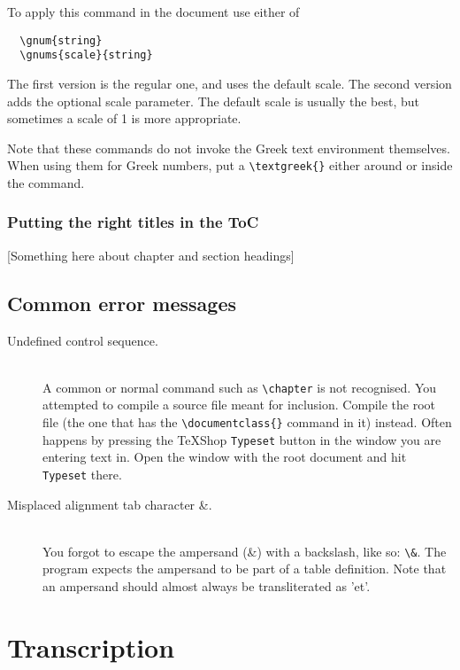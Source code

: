 \documentclass{report}
\begin{document}
To apply this command in the document use either of
\begin{verbatim}
  \gnum{string}
  \gnums{scale}{string}
\end{verbatim}
The first version is the regular one, and uses the default scale.
The second version adds the optional scale parameter.
The default scale is usually the best, but
sometimes a scale of 1 is more appropriate.

Note that these commands do not invoke the Greek text environment themselves.
When using them for Greek numbers, put a \verb+\textgreek{}+ either
around or inside the command.


\subsection{Putting the right titles in the ToC}
[Something here about chapter and section headings]

\section{Common error messages}
\begin{description}
\item[Undefined control sequence.] \hfill \\
A common or normal command such as \verb;\chapter;
is not recognised. You attempted to compile a source file meant for inclusion. Compile the root file (the one that has the \verb;\documentclass{}; command in it) instead. Often happens by pressing the TeXShop \texttt{Typeset} button in the window you are entering text in. Open the window with the root document and hit \texttt{Typeset} there.

\item[Misplaced alignment tab character \&.] \hfill \\
You forgot to escape the ampersand (\&) with a backslash, like so: \verb;\&;.
The program expects the ampersand to be part of a table definition.
Note that an ampersand should almost always be transliterated as 'et'.
\end{description}


\chapter{Transcription}
\end{document}
